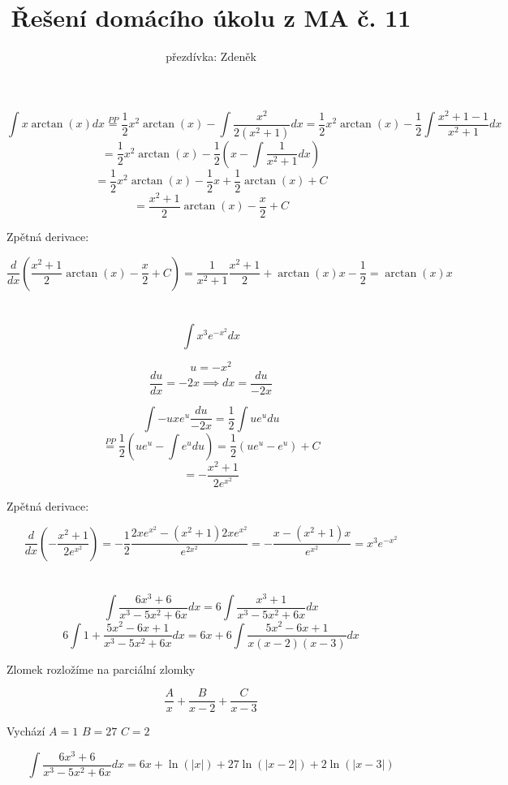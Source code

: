 \documentclass[10pt,a4paper]{article}
\title{Řešení domácího úkolu z MA č. 11}
\author{přezdívka: Zdeněk}
\date{}
\theoremstyle{plain}
\theoremstyle{definition}
\begin{document}
\maketitle

\section{}

\[ \int x \arctan(x) dx \overset{PP}{=} \frac12 x^2 \arctan(x) - \int \frac{x^2}{2(x^2+1)} dx
=  \frac12 x^2 \arctan(x) - \frac12 \int \frac{x^2 + 1 - 1}{x^2+1} dx \]\[
=  \frac12 x^2 \arctan(x) - \frac12 \left(x -  \int \frac{1}{x^2+1} dx \right)  \]\[
=  \frac12 x^2 \arctan(x) - \frac12 x + \frac12\arctan(x) + C 
\]\[
=  \frac{x^2 + 1}2  \arctan(x) - \frac{x}2  + C 
\]

Zpětná derivace:

\[ \frac{d}{dx} \left( \frac{x^2 + 1}2  \arctan(x) - \frac{x}2  + C  \right)
= \frac1{x^2 + 1}\frac{x^2 + 1}2 + \arctan(x) x  - \frac12 =  \arctan(x) x  \]

\section{}
\[
\int x^3 e^{-x^2} dx 
\]

\[ u = -x^2 \]
\[ \frac{du}{dx} = -2x \implies dx = \frac{du}{-2x} \]

\[ \int -ux e^{u}  \frac{du}{-2x}   = \frac12 \int ue^{u}  du  \]\[
\overset{PP}{=}  \frac12 \left( ue^{u} - \int e^{u}  du \right) =    \frac12 \left( ue^{u} - e^{u} \right) + C  \]
\[ = - \frac{x^2 + 1}{2e^{x^2}}  \]


Zpětná derivace:

\[
 \frac{d}{dx} \left(- \frac{x^2 + 1}{2e^{x^2}} \right)
 = - \frac12 \frac{2xe^{x^2} - (x^2 + 1) 2xe^{x^2}}{e^{2x^2}}
 =  - \frac{x - (x^2 + 1) x}{e^{x^2}}
 = x^3 e^{-x^2}
\]

\section{}

\[ \int \frac{6x^3 + 6}{x^3 - 5x^2 + 6x} dx = 6 \int \frac{x^3 + 1}{x^3 - 5x^2 + 6x} dx  \] 
\[
6 \int 1 + \frac{5x^2 - 6x + 1}{x^3 - 5x^2 + 6x} dx = 6x + 6 \int   \frac{5x^2 - 6x + 1}{x(x-2)(x-3)} dx 
\]

Zlomek rozložíme na parciální zlomky 

\[ \frac{A}{x} + \frac{B}{x-2} + \frac{C}{x-3} \]

Vychází $A = 1$ $B =27$ $C = 2$

\[ \int \frac{6x^3 + 6}{x^3 - 5x^2 + 6x} dx = 6x + \ln(|x|) + 27\ln(|x-2|) + 2\ln(|x-3|) \]
\end{document}
